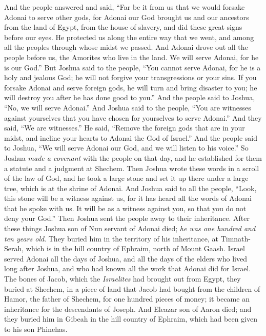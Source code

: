 \begin{biblechapter}
\verse And the people answered and said, “Far be it from us that we would forsake Adonai to serve other gods,
\verse for Adonai our God brought us and our ancestors from the land of Egypt, from the house of slavery, and did these great signs before our eyes. He protected us along the entire way that we went, and among all the peoples through whose midst we passed.
\verse And Adonai drove out all the people before us, the Amorites who live in the land. We will serve Adonai, for he is our God.”
\verse But Joshua said to the people, “You cannot serve Adonai, for he is a holy and jealous God; he will not forgive your transgressions or your sins.
\verse If you forsake Adonai and serve foreign gods, he will turn and bring disaster to you; he will destroy you after he has done good to you.”
\verse And the people said to Joshua, “No, we will serve Adonai.”
\verse And Joshua said to the people, “You are witnesses against yourselves that you have chosen for yourselves to serve Adonai.” And they said, “We are witnesses.”
\verse He said, “Remove the foreign gods that are in your midst, and incline your hearts to Adonai the God of Israel.”
\verse And the people said to Joshua, “We will serve Adonai our God, and we will listen to his voice.”
\verse So Joshua \textit{made a covenant} with the people on that day, and he established for them a statute and a judgment at Shechem.
\verse Then Joshua wrote these words in a scroll of the law of God, and he took a large stone and set it up there under a large tree, which is at the shrine of Adonai.
\verse And Joshua said to all the people, “Look, this stone will be a witness against us, for it has heard all the words of Adonai that he spoke with us. It will be as a witness against you, so that you do not deny your God.”
\verse Then Joshua sent the people away to their inheritance.
\verse After these things Joshua son of Nun servant of Adonai died; \textit{he was one hundred and ten years old}.
\verse They buried him in the territory of his inheritance, at Timnath-Serah, which is in the hill country of Ephraim, north of Mount Gaash.
\verse Israel served Adonai all the days of Joshua, and all the days of the elders who lived long after Joshua, and who had known all the work that Adonai did for Israel.
\verse The bones of Jacob, which the \textit{Israelites} had brought out from Egypt, they buried at Shechem, in a piece of land that Jacob had bought from the children of Hamor, the father of Shechem, for one hundred pieces of money; it became an inheritance for the descendants of Joseph.
\verse And Eleazar son of Aaron died; and they buried him in Gibeah in the hill country of Ephraim, which had been given to his son Phinehas.
\end{biblechapter}

